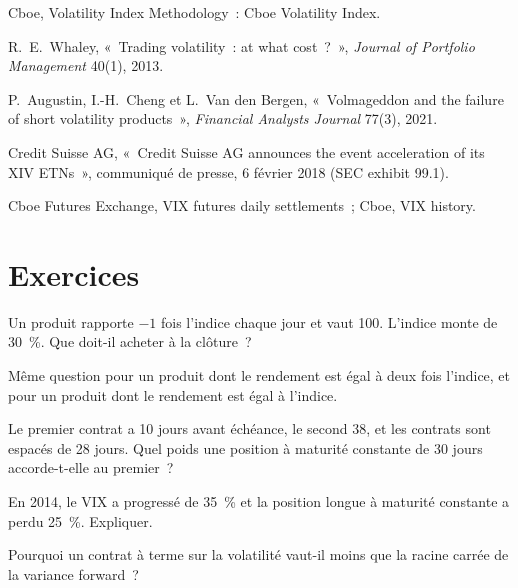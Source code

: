 \begin{omsources}
\item Cboe, Volatility Index Methodology~: Cboe Volatility Index.
\item R.~E.~Whaley, «~Trading volatility~: at what cost~?~», \emph{Journal of Portfolio Management} 40(1), 2013.
\item P.~Augustin, I.-H.~Cheng et L.~Van den Bergen, «~Volmageddon and the failure of short volatility products~», \emph{Financial Analysts Journal}
77(3), 2021.
\item Credit Suisse AG, «~Credit Suisse AG announces the event acceleration of its XIV ETNs~», communiqué de presse, 6 février 2018 (SEC exhibit 99.1).
\item Cboe Futures Exchange, VIX futures daily settlements~; Cboe, VIX history.
\end{omsources}

\section{Exercices}

\begin{exercise}[$\star$]\label{exo:s2:the-volatility-index-complex:1}
Un produit rapporte $-1$ fois l'indice chaque jour et vaut 100. L'indice monte de 30~\%. Que doit-il acheter à la clôture~?
\end{exercise}

\begin{exercise}[$\star$]\label{exo:s2:the-volatility-index-complex:2}
Même question pour un produit dont le rendement est égal à deux fois l'indice, et pour un produit dont le rendement est égal à l'indice.
\end{exercise}

\begin{exercise}[$\star$]\label{exo:s2:the-volatility-index-complex:3}
Le premier contrat a 10 jours avant échéance, le second 38, et les contrats sont espacés de 28 jours. Quel poids une position à maturité constante de 30 jours accorde-t-elle au premier~?
\end{exercise}

\begin{exercise}[$\star\star$]\label{exo:s2:the-volatility-index-complex:4}
En 2014, le VIX a progressé de 35~\% et la position longue à maturité constante a perdu 25~\%. Expliquer.
\end{exercise}

\begin{exercise}[$\star\star$]\label{exo:s2:the-volatility-index-complex:5}
Pourquoi un contrat à terme sur la volatilité vaut-il moins que la racine carrée de la variance forward~?
\end{exercise}

